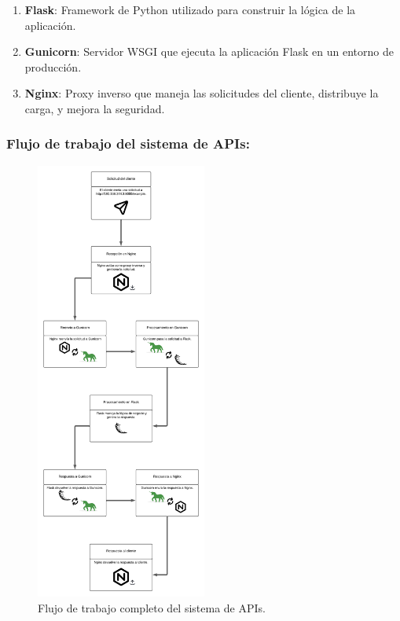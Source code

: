 \begin{enumerate}[label=\alph*)]
    \item \textbf{Flask}: Framework de Python utilizado para construir la lógica de la aplicación.
    \item \textbf{Gunicorn}: Servidor WSGI que ejecuta la aplicación Flask en un entorno de producción.
    \item \textbf{Nginx}: Proxy inverso que maneja las solicitudes del cliente, distribuye la carga, y mejora la seguridad.
\end{enumerate}

\subsubsection*{Flujo de trabajo del sistema de APIs:}

\begin{figure}[H]
    \centering
    \includegraphics[width=0.5\textwidth]{figuras/DiagramaImplementacionGU-NG.png}
    \caption{Flujo de trabajo completo del sistema de APIs.}
    \label{fig:DiagramaImplementacionGU-NG}
\end{figure}

